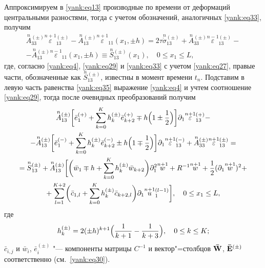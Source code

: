 Аппроксимируем в \eqref{yank:eq13} производные по времени от деформаций центральными
разностями, тогда с учетом обозначений, аналогичных \eqref{yank:eq33}, получим
\begin{multline}
\label{yank:eq35}
\overset{n}{A}{}_{33}^{(\pm )} \overset{n+1}{\varepsilon}{}_{13}^{(\pm )}
-\overset{n}{A}{}_{13}^{(\pm )} \overset{n+1}{\varepsilon}
_{11} (x_1,\pm h ) =2\tau \overset{n}{\dot {\sigma }}{}_{13}^{(\pm )} +
\overset{n}{A}{}_{33}^{(\pm )} \overset{n-1}{\varepsilon}{}_{13}^{(\pm )} 
-
\\
 - \overset{n}{A}{}_{13}^{(\pm )} \overset{n-1}{\varepsilon}{}_{11} (x_1,\pm h )\equiv \overset{n}{S}{}_{13}^{(\pm )} (x_1), \quad  0\le x_1 \le L,
\end{multline}
где, согласно \eqref{yank:eq4}, \eqref{yank:eq29} и \eqref{yank:eq33} с учетом \eqref{yank:eq27}, правые части, обозначенные как
$\overset{n}{S}{}_{13}^{(\pm )}$, известны в момент времени $t_n$.
Подставим в левую часть равенства \eqref{yank:eq35} выражение \eqref{yank:eq4} и учтем соотношение
\eqref{yank:eq29}, тогда после очевидных преобразований получим
\begin{multline}
\label{yank:eq36}
\overset{n}{A}{}_{13}^{(\pm )} 
\biggl[ \bar {e}_1^{(+)} +\sum\limits_{k=0}^K h_k^{(\pm )} \bar {e}_{k+2}^{(+)} \mp h 
\Bigl( 1\pm \frac{1}{2}\Bigr) \biggr]
\partial _1 \overset{n+1}{\varepsilon}{}_{13}^{(+)}
-\\
-\overset{n}{A}{}_{13}^{(\pm )}
\biggl[
\bar {e}_1^{(-)} +\sum\limits_{k=0}^K h_k^{(\pm )} \bar {e}_{k+2}^{(-)} \pm h
\Bigl( 1\mp \frac{1}{2}\Bigr) \biggr]\partial _1 \overset {n+1}{\varepsilon}{}_{13}^{(-)} +
\overset{n}{A}{}_{33}^{(\pm )} \overset{n+1}{\varepsilon}{}_{13}^{(\pm )} =
\\
=\overset{n}{S}{}_{13}^{(\pm )}
+\overset{n}{A}{}_{13}^{(\pm )} 
\biggl[ 
\biggl( \bar {w}_1 \mp h+\sum\limits_{k=0}^K h_k^{(\pm )} \bar {w}_{k+2} \biggr)\partial _1^2 \overset{n+1}{w}+
R^{-1}\overset{n+1}{w} +\frac{1}{2} (\partial _1 \overset{n+1}{w} )^2+ 
\\
+ \sum\limits_{l=1}^{K+2}  
\biggl(\bar{c}_{1,l} +\sum\limits_{k=0}^K h_k^{(\pm )} \bar {c}_{k+2,l} \biggr) \partial _1 
\overset{n+1}{u}{}_1^{(l-1)} \biggr],\quad 0\le x_1 \le L,
\end{multline}
где
\begin{equation}
\label{yank:eq37}
h_k^{(\pm )} =2( \pm h )^{k+1}
\Bigl( \frac{1}{k+1}-\frac{1}{k+3} \Bigr),\quad 0\le k\le K;
\end{equation}
$\bar {c}_{i,j} $ и $\bar {w}_i $, $\bar {e}_i^{(\pm )} $ "--- компоненты
матрицы $C^{-1}$ и вектор"=столбцов ${\bf \bar {W}}$, ${\bf \bar {E}}^{(\pm )}$ соответственно (см.~\eqref{yank:eq30}). 

